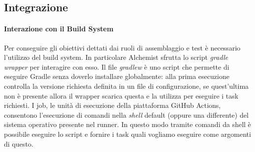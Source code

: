 \subsection{Integrazione}

\paragraph{Interazione con il Build System} Per conseguire gli obiettivi dettati dai ruoli di assemblaggio e test è necessario l'utilizzo del build system. In particolare Alchemist sfrutta lo script \textit{gradle wrapper} per interagire con esso. Il file \textit{gradlew} è uno script che permette di eseguire Gradle senza doverlo installare globalmente: alla prima esecuzione controlla la versione richiesta definita in un file di configurazione, se quest'ultima non è presente allora il wrapper scarica questa e la utilizza per eseguire i task richiesti. I job, le unità di esecuzione della piattaforma GitHub Actions, consentono l'esecuzione di comandi nella \textit{shell} default (oppure una differente) del sistema operativo presente nel runner. In questo modo tramite comandi da shell è possibile eseguire lo script e fornire i task quali vogliamo eseguire come argomenti di questo.

